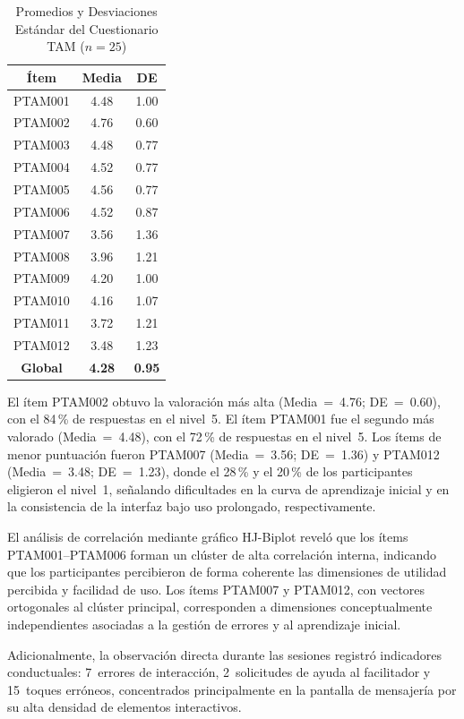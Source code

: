 \documentclass[journal]{IEEEtran}
\begin{document}
\begin{table}[!t]
\caption{Promedios y Desviaciones Est\'andar del Cuestionario TAM ($n=25$)}
\label{tab:tam}
\centering
\small
\renewcommand{\arraystretch}{1.2}
\begin{tabular}{ccc}
\toprule
\textbf{\'Item} & \textbf{Media} & \textbf{DE} \\
\midrule
PTAM001 & 4.48 & 1.00 \\
PTAM002 & 4.76 & 0.60 \\
PTAM003 & 4.48 & 0.77 \\
PTAM004 & 4.52 & 0.77 \\
PTAM005 & 4.56 & 0.77 \\
PTAM006 & 4.52 & 0.87 \\
PTAM007 & 3.56 & 1.36 \\
PTAM008 & 3.96 & 1.21 \\
PTAM009 & 4.20 & 1.00 \\
PTAM010 & 4.16 & 1.07 \\
PTAM011 & 3.72 & 1.21 \\
PTAM012 & 3.48 & 1.23 \\
\midrule
\textbf{Global} & \textbf{4.28} & \textbf{0.95} \\
\bottomrule
\end{tabular}
\end{table}

El \'item PTAM002 obtuvo la valoraci\'on m\'as alta (Media~=~4.76; DE~=~0.60), con el 84\,\% de respuestas en el nivel~5. El \'item PTAM001 fue el segundo m\'as valorado (Media~=~4.48), con el 72\,\% de respuestas en el nivel~5. Los \'items de menor puntuaci\'on fueron PTAM007 (Media~=~3.56; DE~=~1.36) y PTAM012 (Media~=~3.48; DE~=~1.23), donde el 28\,\% y el 20\,\% de los participantes eligieron el nivel~1, se\~nalando dificultades en la curva de aprendizaje inicial y en la consistencia de la interfaz bajo uso prolongado, respectivamente.

El an\'alisis de correlaci\'on mediante gr\'afico HJ-Biplot revel\'o que los \'items PTAM001--PTAM006 forman un cl\'uster de alta correlaci\'on interna, indicando que los participantes percibieron de forma coherente las dimensiones de utilidad percibida y facilidad de uso. Los \'items PTAM007 y PTAM012, con vectores ortogonales al cl\'uster principal, corresponden a dimensiones conceptualmente independientes asociadas a la gesti\'on de errores y al aprendizaje inicial.

Adicionalmente, la observaci\'on directa durante las sesiones registr\'o indicadores conductuales: 7~errores de interacci\'on, 2~solicitudes de ayuda al facilitador y 15~toques err\'oneos, concentrados principalmente en la pantalla de mensajer\'ia por su alta densidad de elementos interactivos.
\end{document}
